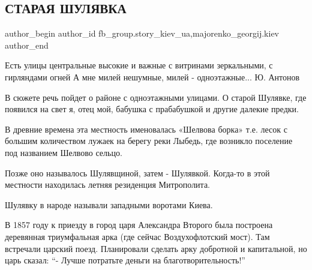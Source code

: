  
 
 
 
 
 
\subsection{СТАРАЯ ШУЛЯВКА}
\label{sec:26_12_2021.fb.fb_group.story_kiev_ua.5.staraja_shuljavka}
 
\ifcmt
 author_begin
   author_id fb_group.story_kiev_ua,majorenko_georgij.kiev
 author_end
\fi


\begin{zznagolos}
\obeycr
Есть улицы центральные
высокие и важные
с витринами зеркальными,
с гирляндами огней
А мне милей нешумные,
милей - одноэтажные...
\smallskip
Ю. Антонов
\restorecr
\end{zznagolos}


В сюжете речь пойдет о районе с одноэтажными улицами. О старой Шулявке, где
появился на свет я, отец мой, бабушка с прабабушкой и другие далекие предки. 


В древние времена эта местность именовалась «Шелвова борка» т.е. лесок с
большим количеством лужаек на берегу реки Лыбедь, где возникло поселение под
названием Шелвово сельцо.

Позже оно называлось Шулявщиной, затем - Шулявкой. Когда-то в этой местности
находилась летняя резиденция Митрополита.


Шулявку в народе называли западными воротами Киева. 

В 1857 году к приезду в город царя Александра Второго была построена деревянная
триумфальная арка (где сейчас Воздухофлотский мост). Там встречали царский
поезд. Планировали сделать арку добротной и капитальной, но царь сказал:
\enquote{- Лучше потратьте деньги на благотворительность!}


